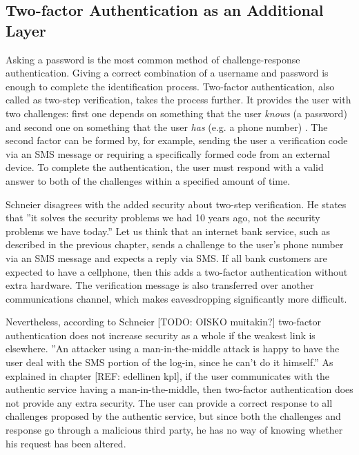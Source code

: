 \documentclass{tktltiki}
\begin{document}
\subsection{Two-factor Authentication as an Additional Layer}

    Asking a password is the most common method of challenge-response authentication. Giving a correct combination of a username and password is enough to complete the identification process. Two-factor authentication, also called as two-step verification, takes the process further. It provides the user with two challenges: first one depends on something that the user \emph{knows} (a password) and second one on something that the user \emph{has} (e.g. a phone number) \cite{NIST_SP800-63}. The second factor can be formed by, for example, sending the user a verification code via an SMS message or requiring a specifically formed code from an external device. To complete the authentication, the user must respond with a valid answer to both of the challenges within a specified amount of time.

    Schneier \cite{schneier_2factor_2005} disagrees with the added security about two-step verification. He states that ''it solves the security problems we had 10 years ago, not the security problems we have today.'' Let us think that an internet bank service, such as described in the previous chapter, sends a challenge to the user's phone number via an SMS message and expects a reply via SMS. If all bank customers are expected to have a cellphone, then this adds a two-factor authentication without extra hardware. The verification message is also transferred over another communications channel, which makes eavesdropping significantly more difficult.

    Nevertheless, according to Schneier \cite{schneier_2factor_2005} [TODO: OISKO muitakin?] two-factor authentication \cite{per se} does not increase security as a whole if the weakest link is elsewhere. ''An attacker using a man-in-the-middle attack is happy to have the user deal with the SMS portion of the log-in, since he can’t do it himself.'' \cite{schneier_2factor_2005} As explained in chapter [REF: edellinen kpl], if the user communicates with the authentic service having a man-in-the-middle, then two-factor authentication does not provide any extra security. The user can provide a correct response to all challenges proposed by the authentic service, but since both the challenges and response go through a malicious third party, he has no way of knowing whether his request has been altered.
    
\end{document}
